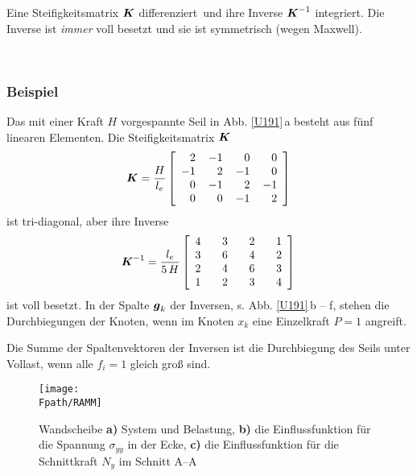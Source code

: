 \hspace*{-12pt}\colorbox{highlightBlue}{\parbox{0.98\textwidth}{ Eine Steifigkeitsmatrix $\mbox{\boldmath $K$}$ \glq differenziert\grq\ und ihre Inverse $\mbox{\boldmath $K$}^{-1}$ \glq integriert\grq. Die Inverse ist {\em immer\/} voll besetzt und sie ist symmetrisch (wegen Maxwell).
}}\\


{\textcolor{sectionTitleBlue}{\subsubsection*{Beispiel}}}
Das mit einer Kraft $H$ vorgespannte Seil in Abb. \ref{U191}\,a besteht aus f\"{u}nf linearen Elementen. Die Steifigkeitsmatrix
$\mbox{\boldmath $K$}$
\begin{align}\label{Eq11}
    \vek K = \frac{H}{l_e}
    \left[ \barr {r @{\hspace{4mm}}r @{\hspace{4mm}}r
@{\hspace{4mm}}r}
      2 & -1 & 0 & 0  \\
      -1 & 2 & -1 & 0 \\
      0 & -1 & 2 & -1 \\
      0 & 0 & -1 & 2  \\
    \earr \right]\,
\end{align}
ist tri-diagonal, aber ihre Inverse
\begin{align}
   \vek K^{-1} = \frac{l_e}{5\,H}
    \left[ \barr {r @{\hspace{4mm}}r @{\hspace{4mm}}r
@{\hspace{4mm}}r}
      4 & \phantom{-}3 & \phantom{-}2 & \phantom{-}1  \\
      3 & 6 & 4 & 2 \\
      2 & 4 & 6 & 3 \\
      1 & 2 & 3 & 4  \\
    \earr \right]\,
\end{align}
ist voll besetzt. In der Spalte $\mbox{\boldmath $g$}_k$ der Inversen, s. Abb. \ref{U191}\,b -- f, stehen die Durchbiegungen der Knoten, wenn im Knoten $x_k$ eine Einzelkraft $P = 1$ angreift.

Die Summe der Spaltenvektoren der Inversen ist die Durchbiegung des Seils unter Vollast, wenn alle $f_i = 1$ gleich gro{\ss} sind.
\begin{figure}[tbp] \centering
\if {} \sidecaption \fi
\texttt{[image: \\Fpath/RAMM]}
\caption{Wandscheibe {\bf a)} System und Belastung, {\bf b)} die Einflussfunktion f\"{u}r die
Spannung $\sigma_{yy}$ in der Ecke, {\bf c)} die Einflussfunktion f\"{u}r die Schnittkraft
$N_y$ im Schnitt A--A } \label{Ramm214}
\end{figure}%



